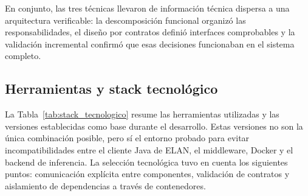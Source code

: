 \documentclass[11pt,a4paper]{article}
\begin{document}
En conjunto, las tres técnicas llevaron de información técnica dispersa a una arquitectura verificable: la descomposición funcional organizó las responsabilidades, el diseño por contratos definió interfaces comprobables y la validación incremental confirmó que esas decisiones funcionaban en el sistema completo.

\subsection{Herramientas y stack tecnológico}

La Tabla~\ref{tab:stack_tecnologico} resume las herramientas utilizadas y las versiones establecidas como base durante el desarrollo. Estas versiones no son la única combinación posible, pero sí el entorno probado para evitar incompatibilidades entre el cliente Java de ELAN, el middleware, Docker y el backend de inferencia. La selección tecnológica tuvo en cuenta los siguientes puntos: comunicación explícita entre componentes, validación de contratos y aislamiento de dependencias a través de contenedores.
\end{document}
